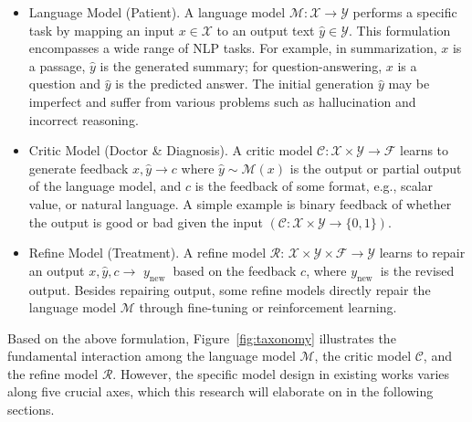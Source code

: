 \documentclass[a4paper,oneside]{book}
\begin{document}
\begin{itemize}
  \item Language Model (Patient). A language model $\mathcal{M}: \mathcal{X} \rightarrow \mathcal{Y}$ performs a specific task by mapping an input $x \in \mathcal{X}$ to an output text $\hat{y} \in \mathcal{Y}$. This formulation encompasses a wide range of NLP tasks. For example, in summarization, $x$ is a passage, $\hat{y}$ is the generated summary; for question-answering, $x$ is a question and $\hat{y}$ is the predicted answer. The initial generation $\hat{y}$ may be imperfect and suffer from various problems such as hallucination and incorrect reasoning.

  \item Critic Model (Doctor \& Diagnosis). A critic model $\mathcal{C}: \mathcal{X} \times \mathcal{Y} \rightarrow \mathcal{F}$ learns to generate feedback $x, \hat{y} \rightarrow c$ where $\hat{y} \sim \mathcal{M}(x)$ is the output or partial output of the language model, and $c$ is the feedback of some format, e.g., scalar value, or natural language. A simple example is binary feedback of whether the output is good or bad given the input $(\mathcal{C}: \mathcal{X} \times \mathcal{Y} \rightarrow\{0,1\})$.

  \item Refine Model (Treatment). A refine model $\mathcal{R}$: $\mathcal{X} \times \mathcal{Y} \times \mathcal{F} \rightarrow \mathcal{Y}$ learns to repair an output $x, \hat{y}, c \rightarrow$ $y_{\text {new }}$ based on the feedback $c$, where $y_{\text {new }}$ is the revised output. Besides repairing output, some refine models directly repair the language model $\mathcal{M}$ through fine-tuning or reinforcement learning.
\end{itemize}

Based on the above formulation, Figure~\ref{fig:taxonomy} illustrates the fundamental interaction among the language model $\mathcal{M}$, the critic model $\mathcal{C}$, and the refine model $\mathcal{R}$. However, the specific model design in existing works varies along five crucial axes, which this research will elaborate on in the following sections.
\end{document}
